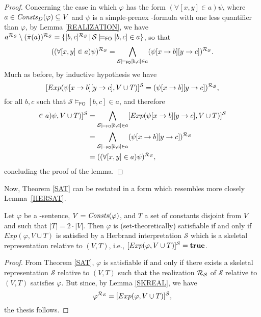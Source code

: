 \documentclass[manyauthors]{fundam}
\newcommand{\HExp}{Exp}
\newcommand{\nonpairssym}{\bar{\pi}}
\newcommand{\nonpairs}[1]{\nonpairssym(#1)}
\newcommand{\atset}{\mathcal{S}}
\newcommand{\DomConsts}{\Consts_D}
\newcommand{\consta}{a}
\newcommand{\constb}{b}
\newcommand{\constc}{c}
\newcommand{\subst}[3]{#1[#2\rightarrow#3]}
\newcommand{\fomodels}[2]{#1 \models_{\mathsf{FO}} #2}
\begin{document}
\begin{proof}
Concerning the case in which $\varphi$ has the form
$(\forall [x,y] \in \consta)\psi$, where $a \in \DomConsts(\varphi) 
\subseteq V$ and $\psi$ is a simple-prenex \Forallpizero-formula with 
one less quantifier than $\varphi$, by Lemma \ref{REALIZATION}, we 
have
$\consta^{\Realization_{\!\atset}}
\setminus (\nonpairs{\consta})^{\Realization_{\!\atset}}=\{ [\constb, 
\constc]^{\Realization_{\!\atset}} \,|\,
\fomodels{\atset}{[\constb, \constc] \in \consta} \}$, so that
\[
((\forall [x,y] \in \consta)\psi)^{\Realization_{\!\atset}} = 
\bigwedge\limits_{\fomodels{\atset}{[\constb, \constc] \in\consta}} 
(\subst{\subst{\psi}{x}{\constb}}{y}{\constc})^{\Realization_{\!\atset}}. 
\]
Much as before, by inductive hypothesis we have
\[
   [\HExp(\subst{\subst{\psi}{x}{\constb}}{y}{\constc}, V \cup 
T)]^{\atset} = 
(\subst{\subst{\psi}{x}{\constb}}{y}{\constc})^{\Realization_{\!\atset}} 
,
\]
for all $b,c$ such that $\fomodels{\atset}{[\constb, \constc] 
\in\consta}$, and therefore
\begin{align*}
  [\HExp((\forall [x,y] \in \consta)\psi, V \cup T)]^{\atset} &=
  \bigwedge\limits_{\fomodels{\atset}{[\constb, \constc] 
\in\consta}}[\HExp(\subst{\subst{\psi}{x}{\constb}}{y}{\constc}, V 
\cup T)]^{\atset}  \\
&=  \bigwedge\limits_{\fomodels{\atset}{[\constb, \constc] 
\in\consta}} 
(\subst{\subst{\psi}{x}{\constb}}{y}{\constc})^{\Realization_{\!\atset}}\\
&= ((\forall [x,y] \in \consta)\psi)^{\Realization_{\!\atset}} ,
\end{align*}
concluding the proof of the lemma.%
\end{proof}
%
Now, Theorem \ref{SAT} can be restated in a form which resembles more closely
Lemma~\ref{HERSAT}.

\begin{corollary}\label{SATEXP}
Let $\varphi$ be a \Forallpizero-sentence, $V=\mathit{Consts}(\varphi)$,
and $T$ a set of constants disjoint from $V$ and such that
$|T|=2\cdot|V|$. Then $\varphi$ is (set-theoretically) satisfiable
if and only if $\HExp(\varphi, V\cup T)$ is satisfied by a Herbrand 
interpretation
$\atset$ which is a skeletal representation
relative to $(V,T)$, i.e., $[\HExp(\varphi, V\cup T)]^\atset = \true$.
\end{corollary}
\begin{proof}
 From Theorem \ref{SAT}, $\varphi$ is satisfiable if and only if
there exists a skeletal representation $\atset$
relative to $(V,T)$ such that the realization $\Realization_{\!\atset}$
of $\atset$ relative to $(V,T)$ satisfies $\varphi$. But since, by 
Lemma \ref{SKREAL}, we have
\[
  \varphi^{\Realization_{\!\atset}} = [\HExp(\varphi, V \cup T)]^{\atset},
\]
the thesis follows. %
\end{proof}
\end{document}
